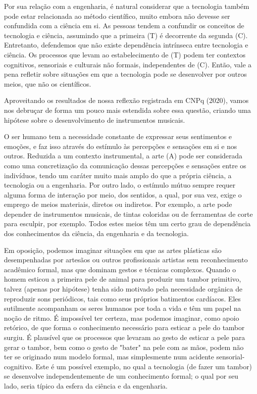 Por sua relação com a engenharia, é natural considerar que a tecnologia também pode estar relacionada ao método científico, muito embora não devesse ser confundida com a ciência em si. As pessoas tendem a confundir os conceitos de tecnologia e ciência, assumindo que a primeira (T) é decorrente da segunda (C). Entretanto, defendemos que não existe dependência intrínseca entre tecnologia e ciência. Os processos que levam ao estabelecimento de (T) podem ter contextos cognitivos, sensoriais e culturais não formais, independentes de (C). Então, vale a pena refletir sobre situações em que a tecnologia pode se desenvolver por outros meios, que não os científicos.

Aproveitando os resultados de nossa reflexão registrada em  CNPq (2020), vamos nos debruçar de forma um pouco mais estendida sobre essa questão, criando uma hipótese sobre o desenvolvimento de instrumentos musicais.

O ser humano tem a necessidade constante de expressar seus sentimentos e emoções, e faz isso através do estímulo às percepções e sensações em si e nos outros. Reduzida a um contexto instrumental, a arte (A) pode ser considerada como uma concretização da comunicação dessas percepções e sensações entre os indivíduos, tendo um caráter muito mais amplo do que a própria ciência, a tecnologia ou a engenharia. Por outro lado, o estímulo mútuo sempre requer alguma forma de interação por meio, dos sentidos, a qual, por sua vez, exige o emprego de meios materiais, diretos ou indiretos. Por exemplo, a arte pode depender de instrumentos musicais, de tintas coloridas ou de ferramentas de corte para esculpir, por exemplo. Todos estes meios têm um certo grau de dependência dos conhecimentos da ciência, da engenharia e da tecnologia.

Em oposição, podemos imaginar situações em que as artes plásticas são desempenhadas por artesãos ou outros profissionais artistas sem reconhecimento acadêmico formal, mas que dominam gestos e técnicas complexos. Quando o homem esticou a primeira pele de animal para produzir um tambor primitivo, talvez (apenas por hipótese) tenha sido motivado pela necessidade orgânica de reproduzir sons periódicos, tais como seus próprios batimentos cardíacos. Eles sutilmente acompanham os seres humanos por toda a vida e têm um papel na noção de ritmo. É impossível ter certeza, mas podemos imaginar, como apoio retórico, de que forma o conhecimento necessário para esticar a pele do tambor surgiu. É plausível que os processos que levaram ao gesto de esticar a pele para gerar o tambor, bem como o gesto de "bater" na pele com as mãos, podem não ter se originado num modelo formal, mas simplesmente num acidente sensorial-cognitivo. Este é um possível exemplo, no qual a tecnologia (de fazer um tambor) se desenvolve independentemente de um conhecimento formal; o qual por seu lado, seria típico da esfera da ciência e da engenharia.

